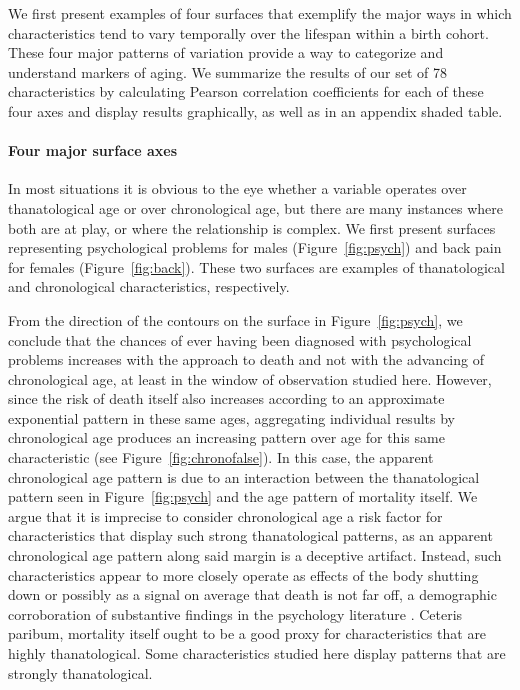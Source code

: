\documentclass[11pt,oneside]{article} %
\begin{document}
We first present examples of four surfaces that exemplify the major ways in
which characteristics tend to vary temporally over the lifespan within a birth
cohort. These four major patterns of variation provide a way to categorize and
understand markers of aging. We summarize the results of our set of 78
characteristics by calculating Pearson correlation coefficients for each of
these four axes and display results graphically, as well as in an appendix
shaded table.

\paragraph{Four major surface axes}
In most situations it is obvious to the eye whether a
variable operates over thanatological age or over chronological age, but there
are many instances where both are at play, or where the relationship is
complex. We first present surfaces representing psychological problems for males
(Figure~\ref{fig:psych}) and back pain for females (Figure~\ref{fig:back}).
These two surfaces are examples of thanatological and
chronological characteristics, respectively.

From the direction of the contours on the surface in Figure~\ref{fig:psych}, we
conclude that the chances of ever having been diagnosed with psychological
problems increases with the approach to death and not with the advancing of
chronological age, at least in the window of observation studied here.
However, since the risk of death itself also increases according to an
approximate exponential pattern in these same ages, aggregating individual
results by chronological age produces an increasing pattern over age for this same
characteristic (see Figure~\ref{fig:chronofalse}).
In this case, the apparent chronological age pattern is due
to an interaction between the thanatological pattern seen in
Figure~\ref{fig:psych} and the age pattern of mortality itself. We argue that it
is imprecise to consider chronological age a risk factor for characteristics that display such strong thanatological patterns, as an
apparent chronological age pattern along said margin is a deceptive
artifact. Instead, such
characteristics appear to more closely operate as effects of the body shutting down or possibly as a signal on average that death is not far off, a demographic corroboration of substantive findings in the psychology literature
\citep{carstensen2006influence}. Ceteris paribum, mortality itself ought to be a
good proxy for characteristics that are highly thanatological.
Some characteristics studied here display patterns that are strongly thanatological.
\end{document}
